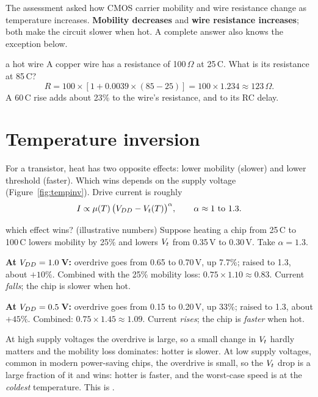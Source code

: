 \begin{onoa}
The assessment asked how CMOS carrier mobility and wire resistance change as temperature increases. \textbf{Mobility decreases} and \textbf{wire resistance increases}; both make the circuit slower when hot. A complete answer also knows the exception below.
\end{onoa}

\begin{worked}{a hot wire}
A copper wire has a resistance of 100\,$\Omega$ at 25\,\textdegree C. What is its resistance at 85\,\textdegree C?
\[
  R = 100 \times [1 + 0.0039 \times (85 - 25)] = 100 \times 1.234 \approx 123\,\Omega.
\]
A 60\,\textdegree C rise adds about 23\% to the wire's resistance, and to its RC delay.
\end{worked}

\section{Temperature inversion}
\label{sec:tempinv}

For a transistor, heat has two opposite effects: lower mobility (slower) and lower threshold (faster). Which wins depends on the supply voltage (Figure~\ref{fig:tempinv}). Drive current is roughly
\[
  I \propto \mu(T)\,\big(V_{DD} - V_{t}(T)\big)^{\alpha}, \qquad \alpha \approx 1 \text{ to } 1.3.
\]

\begin{worked}{which effect wins? (illustrative numbers)}
Suppose heating a chip from 25\,\textdegree C to 100\,\textdegree C lowers mobility by 25\% and lowers $V_{t}$ from 0.35\,V to 0.30\,V. Take $\alpha = 1.3$.

\textbf{At $V_{DD} = 1.0$\,V:} overdrive goes from 0.65 to 0.70\,V, up 7.7\%; raised to 1.3, about $+10\%$. Combined with the 25\% mobility loss: $0.75 \times 1.10 \approx 0.83$. Current \emph{falls}; the chip is slower when hot.

\textbf{At $V_{DD} = 0.5$\,V:} overdrive goes from 0.15 to 0.20\,V, up 33\%; raised to 1.3, about $+45\%$. Combined: $0.75 \times 1.45 \approx 1.09$. Current \emph{rises}; the chip is \emph{faster} when hot.
\end{worked}

At high supply voltages the overdrive is large, so a small change in $V_{t}$ hardly matters and the mobility loss dominates: hotter is slower. At low supply voltages, common in modern power-saving chips, the overdrive is small, so the $V_{t}$ drop is a large fraction of it and wins: hotter is faster, and the worst-case speed is at the \emph{coldest} temperature. This is .

